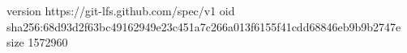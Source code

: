 version https://git-lfs.github.com/spec/v1
oid sha256:68d93d2f63bc49162949e23c451a7c266a013f6155f41cdd68846eb9b9b2747e
size 1572960
